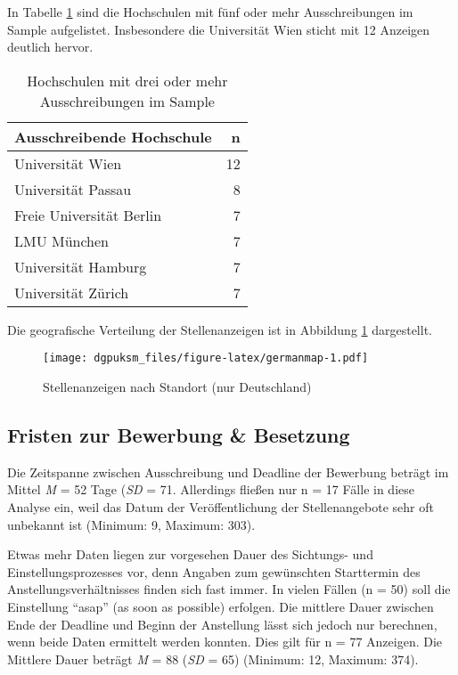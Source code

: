 \documentclass[
]{article}
\begin{document}
In Tabelle \ref{tab:institutions} sind die Hochschulen mit fünf oder mehr Ausschreibungen im Sample aufgelistet. Insbesondere die Universität Wien sticht mit 12 Anzeigen deutlich hervor.

\begin{table}[H]

\caption{\label{tab:institutions}Hochschulen mit drei oder mehr Ausschreibungen im Sample}
\centering
\begin{tabular}[t]{l|r}
\hline
Ausschreibende Hochschule & n\\
\hline
Universität Wien & 12\\
\hline
Universität Passau & 8\\
\hline
Freie Universität Berlin & 7\\
\hline
LMU München & 7\\
\hline
Universität Hamburg & 7\\
\hline
Universität Zürich & 7\\
\hline
\end{tabular}
\end{table}

Die geografische Verteilung der Stellenanzeigen ist in Abbildung \ref{fig:germanmap} dargestellt.

\begin{figure}
\centering
\texttt{[image: dgpuksm\_files/figure-latex/germanmap-1.pdf]}
\caption{\label{fig:germanmap}Stellenanzeigen nach Standort (nur Deutschland)}
\end{figure}

\hypertarget{fristen-zur-bewerbung-besetzung}{%
\subsection{Fristen zur Bewerbung \& Besetzung}\label{fristen-zur-bewerbung-besetzung}}

Die Zeitspanne zwischen Ausschreibung und Deadline der Bewerbung beträgt im Mittel \emph{M} = 52 Tage (\emph{SD} = 71. Allerdings fließen nur n = 17 Fälle in diese Analyse ein, weil das Datum der Veröffentlichung der Stellenangebote sehr oft unbekannt ist (Minimum: 9, Maximum: 303).

Etwas mehr Daten liegen zur vorgesehen Dauer des Sichtungs- und Einstellungsprozesses vor, denn Angaben zum gewünschten Starttermin des Anstellungsverhältnisses finden sich fast immer. In vielen Fällen (n = 50) soll die Einstellung ``asap'' (as soon as possible) erfolgen. Die mittlere Dauer zwischen Ende der Deadline und Beginn der Anstellung lässt sich jedoch nur berechnen, wenn beide Daten ermittelt werden konnten. Dies gilt für n = 77 Anzeigen. Die Mittlere Dauer beträgt \emph{M} = 88 (\emph{SD} = 65) (Minimum: 12, Maximum: 374).
\end{document}
